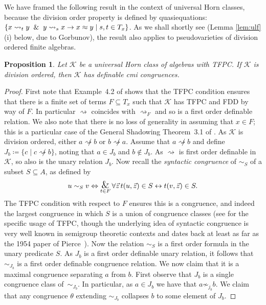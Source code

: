 \documentclass[reqno]{amsart}
\theoremstyle{plain}
\newtheorem{pro}[thm]{Proposition}
\theoremstyle{definition}
\newcommand{\divides}{\rightsquigarrow}
\newcommand{\bigand}{\operatornamewithlimits{\hbox{\Large$\&$}}}
\begin{document}
We have framed the following result in the context of universal Horn classes, because the division order property is defined by quasiequations: $\{x\divides_t y\And y\divides_s x\rightarrow x\approx y\mid s,t\in T_x\}$.   As we shall shortly see (Lemma \ref{lem:ulf}(i) below, due to Gorbunov), the result also applies to pseudovarieties of division ordered finite algebras.  
\begin{pro}\label{pro:divisionordered}
Let $\mathscr{K}$ be a universal Horn class of algebras with TFPC.  If $\mathscr{K}$ is division ordered, then $\mathscr{K}$ has definable cmi congruences.
\end{pro}
\begin{proof}
First note that Example~4.2 of \cite{jactro10} shows that the TFPC condition ensures that there is a finite set of terms $F\subseteq T_x$ such that $\mathscr{K}$ has TFPC and FDD by way of $F$. In particular $\divides$ coincides with $\divides_{F}$ and so is a first order definable relation.  We also note that there is no loss of generality in assuming that $x\in F$; this is a particular case of the General Shadowing Theorem~3.1 of \cite{CDFJ}.
As $\mathscr{K}$ is division ordered, either $a\not\divides b$ or $b\not\divides a$.  Assume that $a\not\divides b$ and define $J_b\coloneqq \{c\mid c\not\divides b\}$, noting that $a\in J_b$ and $b\notin J_b$.  As $\divides$ is first order definable in $\mathscr{K}$, so also is the unary relation $J_b$.  Now recall the \emph{syntactic congruence} of $\sim_{S}$ of a subset $S\subseteq A$, as defined by 
\[
u\sim_{S}v\Leftrightarrow \bigand_{t\in F}\forall \vec{z}\, t(u,\vec{z})\in S\leftrightarrow t(v,\vec{z})\in S.
\]
The TFPC condition with respect to $F$ ensures this is a congruence, and indeed the largest congruence in which $S$ is a union of congruence classes (see \cite[Corollary~2.4]{CDFJ} for the specific usage of TFPC, though the underlying idea of syntactic congruence is very well known in semigroup theoretic contexts and dates back at least as far as the 1954 paper of Pierce~\cite{pie}).  
Now the relation $\sim_S$ is a first order formula in the unary predicate $S$.  
As $J_b$ is a first order definable unary relation, it follows that $\sim_{J_b}$ is a first order definable congruence relation.  
We now claim that it is a maximal congruence separating $a$ from $b$.  
First observe that $J_b$ is a single congruence class of~$\sim_{J_b}$. 
In particular, as $a\in J_b$ we have that $a\not\sim_{j_b}b$.  
We claim that any congruence $\theta$ extending $\sim_{J_b}$ collapses $b$ to some element of $J_b$.  

\end{proof}
\end{document}
